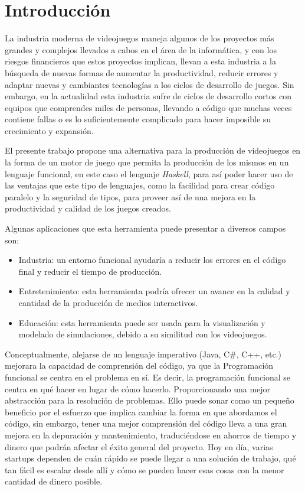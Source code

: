 \chapter{Introducción}
\label{capitulo1}

La industria moderna de videojuegos maneja algunos de los proyectos más grandes y complejos llevados a cabos en el área de la informática, y con los riesgos financieros que estos proyectos implican, llevan a esta industria a la búsqueda de nuevas formas de aumentar la productividad, reducir errores y adaptar nuevas y cambiantes tecnologías a los ciclos de desarrollo de juegos. Sin embargo, en la actualidad esta industria sufre de ciclos de desarrollo cortos con equipos que comprendes miles de personas, llevando a código que muchas veces contiene fallas o es lo suficientemente complicado para hacer imposible su crecimiento y expansión.

El presente trabajo propone una alternativa para la producción de videojuegos en la forma de un motor de juego que permita la producción de los mismos en un lenguaje funcional, en este caso el lenguaje \emph{Haskell}, para así poder hacer uso de las ventajas que este tipo de lenguajes, como la facilidad para crear código paralelo y la seguridad de tipos, para proveer así de una mejora en la productividad y calidad de los juegos creados.

 Algunas aplicaciones que esta herramienta puede presentar a diversos campos son:

\begin{itemize}
\item Industria: un entorno funcional ayudaría a reducir los errores en el código final y reducir el tiempo de producción.
\item Entretenimiento: esta herramienta podría ofrecer un avance en la calidad y cantidad de la producción de medios interactivos.
\item Educación: esta herramienta puede ser usada para la visualización y modelado de simulaciones, debido a su similitud con los videojuegos.
\end{itemize}

Conceptualmente, alejarse de un lenguaje imperativo (Java, C\#, C++, etc.) mejorara la capacidad de comprensión del código, ya que la Programación funcional se centra en el problema en sí. Es decir, la programación funcional se centra en qué hacer en lugar de cómo hacerlo. Proporcionando una mejor abstracción para la resolución de problemas. Ello puede sonar como un pequeño beneficio por el esfuerzo que implica cambiar la forma en que abordamos el código, sin embargo, tener una mejor comprensión del código lleva a una gran mejora en la depuración y mantenimiento, traduciéndose en ahorros de tiempo y dinero que podrán afectar el éxito general del proyecto. Hoy en día, varias startups dependen de cuán rápido se puede llegar a una solución de trabajo, qué tan fácil es escalar desde allí y cómo se pueden hacer esas cosas con la menor cantidad de dinero posible.

